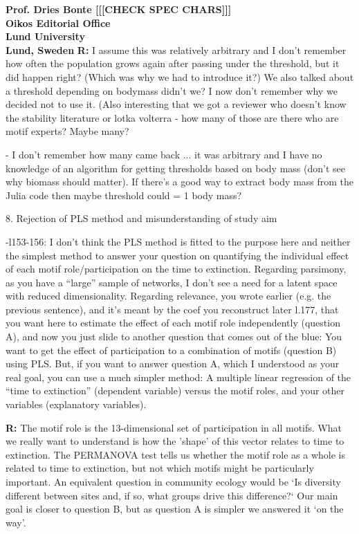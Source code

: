 \documentclass[12pt]{letter}
\begin{document}
\begin{letter}{\bf Prof. Dries Bonte [[[CHECK SPEC CHARS]]]\\
Oikos Editorial Office \\
Lund University \\
Lund, Sweden}
      \textbf{R:}
      I assume this was relatively arbitrary and I don't remember how often the population grows again after passing under the threshold, but it did happen right? (Which was why we had to introduce it?) We also talked about a threshold depending on bodymass didn't we? I now don't remember why we decided not to use it. (Also interesting that we got a reviewer who doesn't know the stability literature or lotka volterra - how many of those are there who are motif experts? Maybe many?

      - I don't remember how many came back ... it was arbitrary and I have no knowledge of an algorithm for getting thresholds based on body mass (don't see why biomass should matter). If there's a good way to extract body mass from the Julia code then maybe threshold could = 1 body mass?


    8. Rejection of PLS method and misunderstanding of study aim

      -l153-156:  I don’t think the PLS method is fitted to the purpose here and neither the simplest method to answer your question on quantifying the individual effect of each motif role/participation on the time to extinction. Regarding parsimony, as you have a “large” sample of networks, I don’t see a need for a latent space with reduced dimensionality. Regarding relevance, you wrote earlier (e.g. the previous sentence), and it’s meant by the coef you reconstruct later l.177, that you want here to estimate the effect of each motif role independently (question A), and now you just slide to another question that comes out of the blue: You want to get the effect of participation to a combination of motifs (question B) using PLS. But, if you want to answer question A, which I understood as your real goal, you can use a much simpler method: A multiple linear regression of the “time to extinction” (dependent variable) versus the motif roles, and your other variables (explanatory variables).

      \textbf{R:}
      The motif role is the 13-dimensional set of participation in all motifs. What we really want to understand is how the 'shape' of this vector relates to time to extinction. The PERMANOVA test tells us whether the motif role as a whole is related to time to extinction, but not which motifs might be particularly important. An equivalent question in community ecology would be `Is diversity different between sites and, if so, what groups drive this difference?` Our main goal is closer to question B, but as question A is simpler we answered it `on the way'.




\end{letter}
\end{document}
